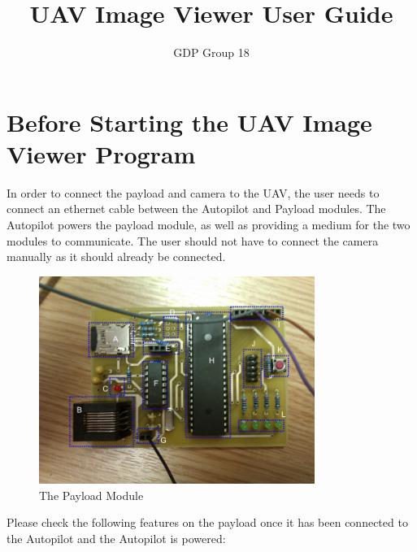 \documentclass[a4paper,11pt]{article}
\author{GDP Group 18}
\title{UAV Image Viewer User Guide}
\begin{document}
\maketitle
\section{Before Starting the UAV Image Viewer Program}
\label{sec:initial}
In order to connect the payload and camera to the UAV,
the user needs to connect an ethernet cable between the Autopilot and Payload modules.
The Autopilot powers the payload module, as well as providing a medium for the 
two modules to communicate.
The user should not have to connect the camera manually as it should already be connected. 

\begin{figure}[!htbp]
\label{fig:payload}
\begin{center}
\includegraphics[width=0.8\textwidth]{PayloadImplementation.png} 
\caption{The Payload Module}
\end{center}
\end{figure}

Please check the following features on the payload once it has been connected 
to the Autopilot and the Autopilot is powered:
\end{document}
